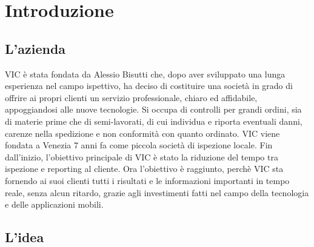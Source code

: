 
\chapter{Introduzione}
\label{cap:introduzione}





\section{L'azienda}

VIC è stata fondata da Alessio Bisutti che, dopo aver sviluppato una lunga esperienza
nel campo ispettivo, ha deciso di costituire una società in grado di offrire ai propri clienti un servizio professionale, chiaro ed affidabile, appoggiandosi alle nuove tecnologie.
Si occupa di controlli per grandi ordini, sia di materie prime che di semi-lavorati, di
cui individua e riporta eventuali danni, carenze nella spedizione e non conformità con
quanto ordinato.
VIC viene fondata a Venezia 7 anni fa come piccola società di ispezione locale. Fin dall'inizio, l'obiettivo principale di VIC è stato la riduzione del tempo tra ispezione e reporting al cliente. Ora l'obiettivo è raggiunto, perchè VIC sta fornendo ai suoi clienti tutti i risultati e le informazioni importanti in tempo reale, senza alcun ritardo, grazie agli investimenti fatti nel campo della tecnologia e delle applicazioni mobili.

\section{L'idea}

